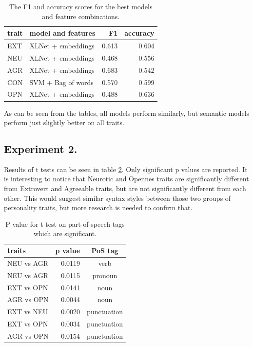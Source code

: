 \documentclass[10pt, a4paper]{article}
\begin{document}
\begin{table}[H]
  \begin{tabular}{llrr}
    \toprule
    trait & model and features &     F1 & accuracy \\
    \midrule
    EXT &   XLNet + embeddings &  0.613 &  0.604 \\
    NEU &   XLNet + embeddings &  0.468 &  0.556 \\
    AGR &   XLNet + embeddings &  0.683 &  0.542 \\
    CON &   SVM + Bag of words &  0.570 &  0.599 \\
    OPN &   XLNet + embeddings &  0.488 &  0.636 \\
    \bottomrule
  \end{tabular}
  \caption{The F1 and accuracy scores for the best models and feature combinations.}
  \label{table:best}
\end{table}

As can be seen from the tables, all models perform similarly, but semantic models perform just slightly better on all traits.

\subsection{Experiment 2.}

Results of t tests can be seen in table \ref{table:ttest}.
Only significant p values are reported.
It is interesting to notice that Neurotic and Opennes traits are significantly different from Extrovert and Agreeable traits, but are not significantly different from each other.
This would suggest similar syntax styles between those two groups of personality traits, but more research is needed to confirm that.

\begin{table}[H]
  \begin{tabular}{lrc}
    \toprule
    traits & p value & PoS tag \\
    \midrule
    NEU vs AGR & 0.0119 & verb \\
    NEU vs AGR & 0.0115 & pronoun \\
    EXT vs OPN & 0.0141 & noun \\
    AGR vs OPN & 0.0044 & noun \\
    EXT vs NEU & 0.0020 & punctuation \\
    EXT vs OPN & 0.0034 & punctuation \\
    AGR vs OPN & 0.0154 & punctuation \\
    \bottomrule
  \end{tabular}
  \caption{P value for t test on part-of-speech tags which are significant.}
  \label{table:ttest}
\end{table}
\end{document}
